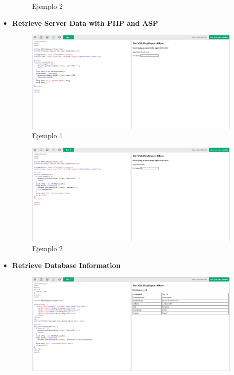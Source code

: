 \documentclass{article}
\begin{document}
\begin{itemize}
\begin{figure}[H]
			\caption{Ejemplo 2}
		\end{figure}
		\newpage
		\item \textbf{Retrieve Server Data with PHP and ASP}
		\begin{figure}[H]
			\centering
			\includegraphics[width=1\textwidth,keepaspectratio]{img/ejemplo28.png}
			\caption{Ejemplo 1}
		\end{figure}
		\begin{figure}[H]
			\centering
			\includegraphics[width=1\textwidth,keepaspectratio]{img/ejemplo29.png}
			\caption{Ejemplo 2}
		\end{figure}
		\newpage
		\item \textbf{Retrieve Database Information}
		\begin{figure}[H]
			\centering
			\includegraphics[width=1\textwidth,keepaspectratio]{img/ejemplo30.png}

\end{figure}
\end{itemize}
\end{document}

